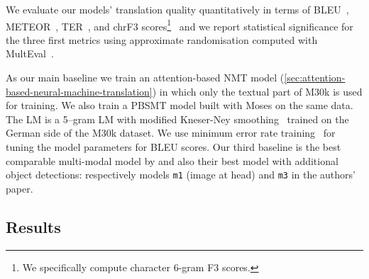 \documentclass[11pt,twocolumn]{article}
\begin{document}
We evaluate our models' translation quality quantitatively in terms of BLEU~\cite{Papinenietal2002}, METEOR~\cite{DenkowskiLavie2014}, TER~\cite{Snoveretal2006}, and chrF3 scores\footnote{We specifically compute character 6-gram F3 scores.}~\cite{Popovic2015} and we report statistical significance for the three first metrics using approximate randomisation computed with \mbox{MultEval}~\cite{Clarketal2011}.

As our main baseline we train an attention-based NMT model (\cref{sec:attention-based-neural-machine-translation}) in which only the textual part of M30k is used for training.
We also train a PBSMT model built with Moses on the same data.
The LM is a 5--gram LM with modified Kneser-Ney smoothing~\cite{KneserNey1995} trained on the German side of the  M30k dataset.
We use minimum error rate training~\cite{Och2003} for tuning the model parameters for BLEU scores.
Our third baseline is the best comparable multi-modal model by  and also their best model with additional object detections: respectively models \texttt{m1} (image at head) and \texttt{m3} in the authors' paper.


\subsection{Results}
\label{sec:results}
\end{document}
